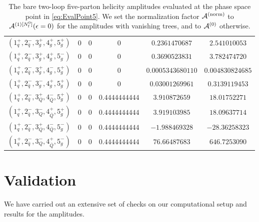 \begin{table}[!htbp]
\begin{adjustbox}{width=1\textwidth}
\begin{tabular}{cccccc}
      \midrule
      $( 1_q^+, 2_{\bar q}^-, 3_g^+, 4_g^+, 5_g^+ )$ & 0 & 0 & 0 & $0.2361470687$ & $2.541010053$ \\
      $( 1_q^+, 2_{\bar q}^-, 3_g^+, 4_g^+, 5_g^- )$ & 0 & 0 & 0 & $0.3690523831$ & $3.782474720$ \\
      $( 1_q^+, 2_{\bar q}^-, 3_g^+, 4_g^-, 5_g^+ )$ & 0 & 0 & 0 & $0.0005343680110$ & $0.004830824685$ \\
      $( 1_q^+, 2_{\bar q}^-, 3_g^-, 4_g^+, 5_g^+ )$ & 0 & 0 & 0 & $0.03001269961$ & $0.3139119453$ \\
      \midrule
      $( 1_q^+, 2_{\bar q}^-, 3_Q^+, 4_{\bar Q}^-, 5_g^+ )$ & 0 & 0 & $0.4444444444$ & $3.910872659$ & $18.01752271$ \\
      $( 1_q^+, 2_{\bar q}^-, 3_Q^-, 4_{\bar Q}^+, 5_g^+ )$ & 0 & 0 & $0.4444444444$ & $3.919103985$ & $18.09637714$ \\
      $( 1_q^+, 2_{\bar q}^-, 3_Q^+, 4_{\bar Q}^-, 5_g^- )$ & 0 & 0 & $0.4444444444$ & $-1.988469328$ & $-28.36258323$ \\
      $( 1_q^+, 2_{\bar q}^-, 3_Q^-, 4_{\bar Q}^+, 5_g^- )$ & 0 & 0 & $0.4444444444$ & $76.66487683$ & $646.7253090$ \\
      \bottomrule
    \end{tabular}
  \end{adjustbox}
  \caption{The bare two-loop five-parton helicity amplitudes evaluated
    at the phase space point in \cref{eq:EvalPoint5}. We set the
    normalization factor $\mathcal{A}^\mathrm{(norm)}$ to $\mathcal{A}^{(1)[N_\mathrm{f}^0]}(\epsilon=0)$ for the
    amplitudes with vanishing trees, and to $\mathcal{A}^{(0)}$ otherwise.} 
  \label{tab:results5parton}
\end{table}

\section{Validation}
\label{sec:Validation-5parton}

We have carried out an extensive set of checks on our computational setup and results for the amplitudes.


